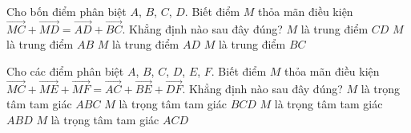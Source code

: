 \begin{ex}%
	Cho bốn điểm phân biệt $A$, $B$, $C$, $D$. Biết điểm $M$ thỏa mãn điều kiện $\overrightarrow{MC}+\overrightarrow{MD}=\overrightarrow{AD}+\overrightarrow{BC}$. Khẳng định nào sau đây đúng?
	\choice
	{$M$ là trung điểm $CD$}
	{\True $M$ là trung điểm $AB$}
	{$M$ là trung điểm $AD$}
	{$M$ là trung điểm $BC$}
\end{ex}
\begin{ex}%
	Cho các điểm phân biệt $A$, $B$, $C$, $D$, $E$, $F$. Biết điểm $M$ thỏa mãn điều kiện $\overrightarrow{MC}+\overrightarrow{ME}+\overrightarrow{MF}=\overrightarrow{AC}+\overrightarrow{BE}+\overrightarrow{DF}$. Khẳng định nào sau đây đúng?
	\choice
	{$M$ là trọng tâm tam giác $ABC$}
	{$M$ là trọng tâm tam giác $BCD$}
	{\True $M$ là trọng tâm tam giác $ABD$}
	{$M$ là trọng tâm tam giác $ACD$}
\end{ex}
